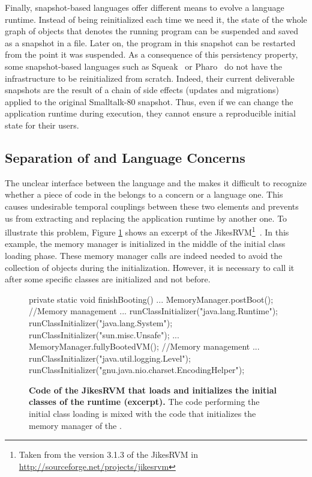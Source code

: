 Finally, snapshot-based languages offer different means to evolve a language runtime. Instead of being reinitialized each time we need it, the state of the whole graph of objects that denotes the running program can be suspended and saved as a snapshot in a file. Later on, the program in this snapshot can be restarted from the point it was suspended. As a consequence of this persistency property, some snapshot-based languages such as Squeak~\cite{Inga97a} or Pharo~\cite{Blac09a} do not have the infrastructure to be reinitialized from scratch. Indeed, their current deliverable snapshots are the result of a chain of side effects (updates and migrations) applied to the original Smalltalk-80 snapshot. Thus, even if we can change the application runtime during execution, they cannot ensure a reproducible initial state for their users.

\subsection*{Separation of \VM and Language Concerns}

The unclear interface between the language and the \VM makes it difficult to recognize whether a piece of code in the \VM belongs to a \VM concern or a language one. This causes undesirable temporal couplings between these two elements and prevents us from extracting and replacing the application runtime by another one.
To illustrate this problem, Figure \ref{code:jikes_vm_initialization} shows an excerpt of the JikesRVM\footnote{Taken from the version 3.1.3 of the JikesRVM in \url{http://sourceforge.net/projects/jikesrvm}}~\cite{Alpe00a}. In this example, the memory manager is initialized in the middle of the initial class loading phase. These memory manager calls are indeed needed to avoid the collection of objects during the initialization. However, it is necessary to call it after some specific classes are initialized and not before.

\begin{figure}[ht]
\begin{code}
private static void finishBooting() {
    ...
    MemoryManager.postBoot(); //Memory management
    ...
    runClassInitializer("java.lang.Runtime");
    runClassInitializer("java.lang.System");
    runClassInitializer("sun.misc.Unsafe");
    ...
    MemoryManager.fullyBootedVM(); //Memory management
    ...
    runClassInitializer("java.util.logging.Level");
    runClassInitializer("gnu.java.nio.charset.EncodingHelper");
}
\end{code}
\caption{\textbf{Code of the JikesRVM that loads and initializes the initial classes of the runtime (excerpt).} The code performing the initial class loading is mixed with the code that initializes the memory manager of the \VM.\label{code:jikes_vm_initialization}}
\end{figure}

